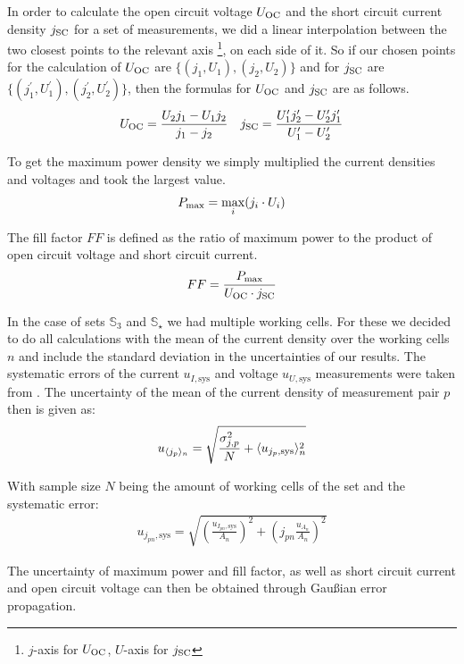\documentclass[a4paper,10pt,twocolumn]{article}
\begin{document}
\begin{extract*}
In order to calculate the open circuit voltage $U_{\text{OC}}$ and the short circuit current density $j_{\text{SC}}$ for a set of measurements, we did a linear interpolation between the two closest points to the relevant axis \footnote{$j$-axis for $U_{\text{OC}}$, $U$-axis for $j_{\text{SC}}$}, on each side of it. So if our chosen points for the calculation of $U_{\text{OC}}$ are $\{(j_1,U_1),(j_2,U_2)\}$ and for $j_{\text{SC}}$ are $\{(j_1^\prime,U_1^\prime),(j_2^\prime,U_2^\prime)\}$, then the formulas for $U_{\text{OC}}$ and $j_{\text{SC}}$ are as follows.
\begin{align}
	U_{\text{OC}} = \frac{U_2 j_1 - U_1 j_2}{j_1-j_2}\quad j_{\text{SC}} = \frac{U_1^\prime j_2^\prime - U_2^\prime j_1^\prime}{U_1^\prime-U_2^\prime}
\end{align}

To get the maximum power density we simply multiplied the current densities and voltages and took the largest value.
\begin{align}
	P_{\text{max}} = \max_{i} (j_i\cdot U_i)
\end{align}

The fill factor $FF$ is defined as the ratio of maximum power to the product of open circuit voltage and short circuit current.
\begin{align}
	FF = \frac{P_{\text{max}}}{U_{\text{OC}} \cdot j_{\text{SC}}}
\end{align}

In the case of sets $\mathbb{S}_3$ and $\mathbb{S}_\star$ we had multiple working cells. For these we decided to do all calculations with the mean of the current density over the working cells $n$ and include the standard deviation in the uncertainties of our results. The systematic errors of the current $u_{I,\text{sys}}$ and voltage $u_{U,\text{sys}}$ measurements were taken from \cite{keithley}. The uncertainty of the mean of the current density of measurement pair $p$ then is given as:
\begin{align}
	u_{\langle j_p \rangle_n} = \sqrt{\frac{\sigma_{j,p}^2}{N} + \langle u_{j_p,\text{sys}} \rangle_n^2}
\end{align}

With sample size $N$ being the amount of working cells of the set and the systematic error:
\begin{align}
	u_{j_{pn},\text{sys}} = \sqrt{ \left( \frac{ u_{I_{pn},\text{sys}}}{A_n}\right)^2+\left( j_{pn}\frac{u_{A_n}}{A_n} \right)^2}
\end{align}

The uncertainty of maximum power and fill factor, as well as short circuit current and open circuit voltage can then be obtained through Gaußian error propagation.


\end{extract*}
\end{document}
